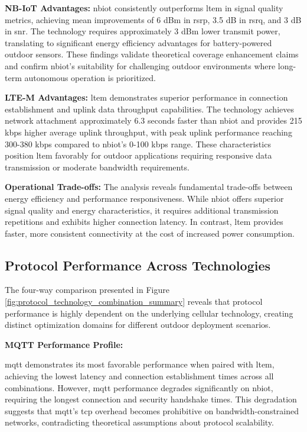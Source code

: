 \documentclass[12pt, english, openany]{book}
\begin{document}
\textbf{NB-IoT Advantages:} \gls{nbiot} consistently outperforms \gls{ltem} in signal quality metrics, achieving mean improvements of 6 dBm in \gls{rsrp}, 3.5 dB in \gls{rsrq}, and 3 dB in \gls{snr}. The technology requires approximately 3 dBm lower transmit power, translating to significant energy efficiency advantages for battery-powered outdoor sensors. These findings validate theoretical coverage enhancement claims and confirm \gls{nbiot}'s suitability for challenging outdoor environments where long-term autonomous operation is prioritized.

\textbf{LTE-M Advantages:} \gls{ltem} demonstrates superior performance in connection establishment and uplink data throughput capabilities. The technology achieves network attachment approximately 6.3 seconds faster than \gls{nbiot} and provides 215 kbps higher average uplink throughput, with peak uplink performance reaching 300-380 kbps compared to \gls{nbiot}'s 0-100 kbps range. These characteristics position \gls{ltem} favorably for outdoor applications requiring responsive data transmission or moderate bandwidth requirements.

\textbf{Operational Trade-offs:} The analysis reveals fundamental trade-offs between energy efficiency and performance responsiveness. While \gls{nbiot} offers superior signal quality and energy characteristics, it requires additional transmission repetitions and exhibits higher connection latency. In contrast, \gls{ltem} provides faster, more consistent connectivity at the cost of increased power consumption.

\subsection{Protocol Performance Across Technologies}

The four-way comparison presented in Figure \ref{fig:protocol_technology_combination_summary} reveals that protocol performance is highly dependent on the underlying cellular technology, creating distinct optimization domains for different outdoor deployment scenarios.

\textbf{MQTT Performance Profile:}

\gls{mqtt} demonstrates its most favorable performance when paired with \gls{ltem}, achieving the lowest latency and connection establishment times across all combinations. However, \gls{mqtt} performance degrades significantly on \gls{nbiot}, requiring the longest connection and security handshake times. This degradation suggests that \gls{mqtt}'s \gls{tcp} overhead becomes prohibitive on bandwidth-constrained networks, contradicting theoretical assumptions about protocol scalability.
\end{document}
